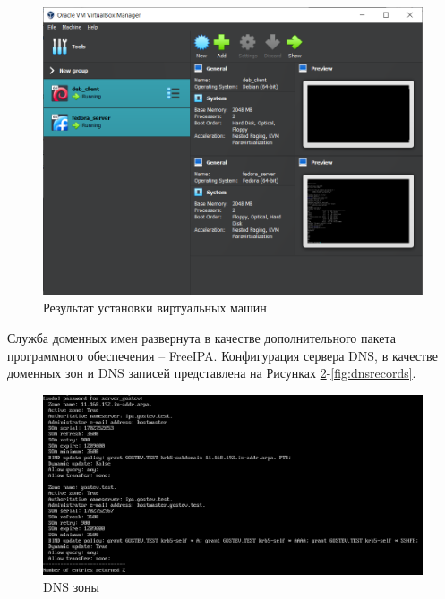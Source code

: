 \documentclass[14pt, a4paper]{extarticle}
\numberwithin{equation}{section}
\begin{document}
\begin{figure}[H]
        \centering
        \includegraphics[scale=0.6]{vm_installation.png}
        \caption{Результат установки виртуальных машин}
        \label{fig:vm_installation}
\end{figure}




Служба доменных имен развернута в качестве дополнительного пакета программного обеспечения -- FreeIPA.
Конфигурация сервера DNS, в качестве доменных зон и DNS записей представлена на Рисунках \ref{fig:dnszones}-\ref{fig:dnsrecords}. 

\begin{figure}[H]
        \centering
        \includegraphics[scale=0.7]{services/dns/dnszones.png}
        \caption{DNS зоны}
        \label{fig:dnszones}
\end{figure}
\end{document}

